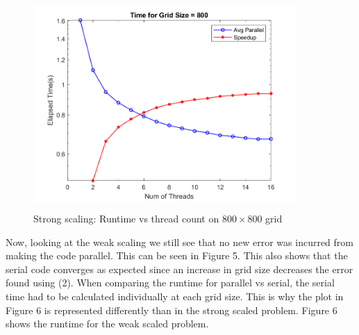 \documentclass[12pt]{article}
\begin{document}
	\begin{figure}[H]
	\centering
	\includegraphics[width=100mm,height=80mm]{timeVthread800.png}
	\caption{Strong scaling: Runtime vs thread count on $800\times800$ grid}
\end{figure}
	\newpage
	Now, looking at the weak scaling we still see that no new error was incurred from making the code parallel. This can be seen in Figure 5. This also shows that the serial code converges as expected since an increase in grid size decreases the error found using (2). When comparing the runtime for parallel vs serial, the serial time had to be calculated individually at each grid size. This is why the plot in Figure 6 is represented differently than in the strong scaled problem. Figure 6 shows the runtime for the weak scaled problem. 
\end{document}
